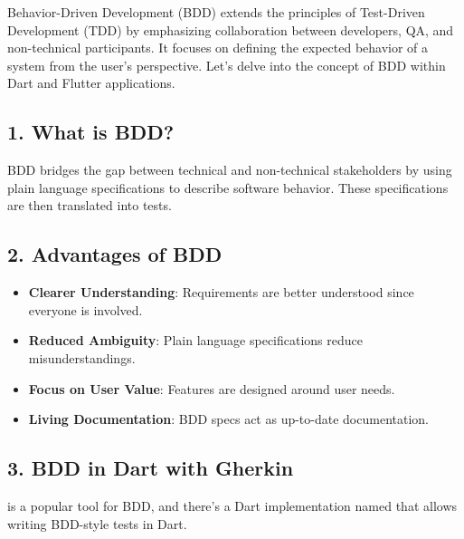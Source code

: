 Behavior-Driven Development (BDD) extends the principles of Test-Driven Development (TDD) by emphasizing collaboration between developers, QA, and non-technical participants. 
It focuses on defining the expected behavior of a system from the user's perspective. 
Let's delve into the concept of BDD within Dart and Flutter applications.

\subsection*{1. What is BDD?}

BDD bridges the gap between technical and non-technical stakeholders by using plain language specifications to describe software behavior. 
These specifications are then translated into tests.

\subsection*{2. Advantages of BDD}

\begin{itemize}
 \item \textbf{Clearer Understanding}: Requirements are better understood since everyone is involved.
 \item \textbf{Reduced Ambiguity}: Plain language specifications reduce misunderstandings.
 \item \textbf{Focus on User Value}: Features are designed around user needs.
 \item \textbf{Living Documentation}: BDD specs act as up-to-date documentation.
\end{itemize}

\subsection*{3. BDD in Dart with Gherkin}

 is a popular tool for BDD, and there's a Dart implementation named  that allows writing BDD-style tests in Dart.


